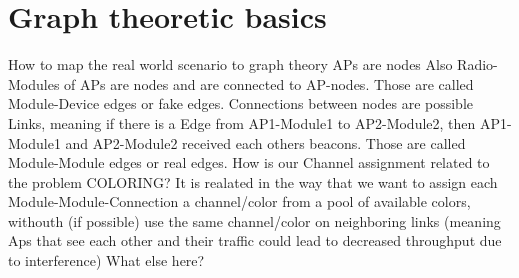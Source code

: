 \section{Graph theoretic basics}
  How to map the real world scenario to graph theory\newline
    APs are nodes \newline
    Also Radio-Modules of APs are nodes and are connected to AP-nodes. Those are called Module-Device edges or fake edges.\newline
    Connections between nodes are possible Links, meaning if there is a Edge from AP1-Module1 to AP2-Module2, then AP1-Module1 and AP2-Module2 received each others beacons. Those are called Module-Module edges or real edges. \newline
  How is our Channel assignment related to the problem COLORING?\newline
    It is realated in the way that we want to assign each Module-Module-Connection a channel/color from a pool of available colors, withouth (if possible) use the same channel/color on neighboring links (meaning Aps that see each other and their traffic could lead to decreased throughput due to interference)
  What else here?
